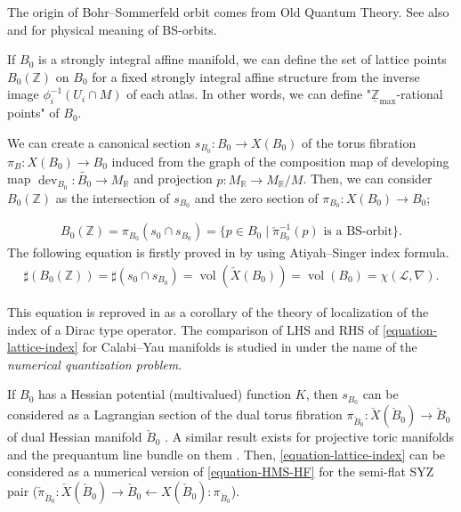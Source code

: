 \documentclass[a4paper,dvipdfmx,reqno,12pt]{amsart}
\theoremstyle{definition}
\newcommand{\Z}{\mathbb{Z}}%
\newcommand{\mcal}[1]{\mathcal{#1}}%
\newcommand{\opn}[1]{\operatorname{#1}}
\numberwithin{equation}{section}
\begin{document}
The origin of Bohr--Sommerfeld orbit comes from
Old Quantum Theory.
See also \cite[15.2, Chapter 22]{MR3112817}
and \cite[Remark 4.3]{MR1270931} for physical meaning 
of BS-orbits.





If $B_0$ is a strongly integral affine manifold,
we can define the set of lattice points $B_0(\Z)$ 
on $B_0$ for a fixed strongly integral affine structure from 
the inverse image $\phi^{-1}_i(U_i\cap M)$ of each atlas.
In other words, we can define 
"$\underline{\Z}_{\max}$-rational points" of $B_0$.


We can create a canonical section 
$s_{B_0}\colon B_0 \to X(B_0)$ of the torus fibration
 $\pi_B:X(B_0)\to B_0$
induced from the graph of the composition map of developing map
$\opn{dev}_{B_0}\colon \widetilde{B_0}\to M_{{\mathbb{R}}}$ 
\cite[p.641]{goldmanRadianceObstructionParallel1984a} and projection
$p:M_{{\mathbb{R}}}\to M_{{\mathbb{R}}}/M$. 
Then, we can consider $B_0(\Z)$ as the intersection of 
$s_{B_0}$ and the zero section of 
$\pi_{B_0}:X(B_0)\to B_0$;

\begin{align}
B_0(\mathbb{Z})=\pi_{B_0}(s_0\cap s_{B_0})
=\{p\in B_0 \mid  \check{\pi}_{B_0}^{-1}(p) 
\text{ is a BS-orbit}\}.
\end{align}
The following equation is firstly proved in 
\cite[Corollary 4.1]{MR1461965} by using Atiyah--Singer index formula.
\begin{align} \label{equation-lattice-index}
\sharp (B_0(\Z))=\sharp (s_0\cap s_{B_0})
=\opn{vol}(\check{X}(B_0))=\opn{vol}(B_0)
=\chi(\mcal{L},\nabla).
\end{align}

This equation is reproved in \cite{MR2676658} as a 
corollary of the theory of localization of the 
index of a Dirac type operator.
The comparison of LHS and RHS of 
\cref{equation-lattice-index} for
Calabi--Yau manifolds is studied in 
\cite{1999math......2027T} under 
the name of the \emph{numerical quantization problem}.

If $B_0$ has a Hessian potential (multivalued) function $K$, then $s_{B_0}$ can be 
considered as a Lagrangian section of the dual torus 
fibration $\pi_{\check{B}_0}\colon 
\check{X}(\check{B}_0)\to \check{B}_0$ of dual Hessian
manifold $\check{B}_0$ \cite[Proposition 6.9]{MR2567952}.
A similar result exists for projective toric manifolds 
and the prequantum line bundle on them 
\cite[Theorem 3.20]{yamaguchimaster}. 
Then, \cref{equation-lattice-index} can be considered
as a numerical version of \cref{equation-HMS-HF}
for the semi-flat SYZ pair 
($\check{\pi}_{\check{B}_0}\colon \check{X}(\check{B}_0)
\to \check{B}_0 \leftarrow X(\check{B}_0)\colon \pi_{\check{B}_0}$). 
\end{document}
